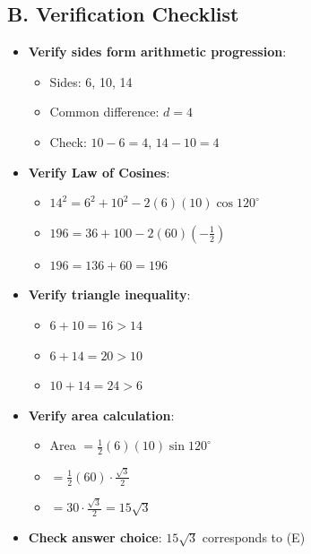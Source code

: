 \documentclass[12pt]{article}
\begin{document}
\begin{verificationbox}
\subsection*{B. Verification Checklist}
\begin{itemize}[leftmargin=*]
    \item \textbf{Verify sides form arithmetic progression}:
    \begin{itemize}
        \item Sides: 6, 10, 14
        \item Common difference: $d = 4$
        \item Check: $10 - 6 = 4$, $14 - 10 = 4$ \checkmark
    \end{itemize}
    \item \textbf{Verify Law of Cosines}:
    \begin{itemize}
        \item $14^2 = 6^2 + 10^2 - 2(6)(10)\cos 120^\circ$
        \item $196 = 36 + 100 - 2(60)(-\frac{1}{2})$
        \item $196 = 136 + 60 = 196$ \checkmark
    \end{itemize}
    \item \textbf{Verify triangle inequality}:
    \begin{itemize}
        \item $6 + 10 = 16 > 14$ \checkmark
        \item $6 + 14 = 20 > 10$ \checkmark
        \item $10 + 14 = 24 > 6$ \checkmark
    \end{itemize}
    \item \textbf{Verify area calculation}:
    \begin{itemize}
        \item Area $= \frac{1}{2}(6)(10)\sin 120^\circ$
        \item $= \frac{1}{2}(60) \cdot \frac{\sqrt{3}}{2}$
        \item $= 30 \cdot \frac{\sqrt{3}}{2} = 15\sqrt{3}$ \checkmark
    \end{itemize}
    \item \textbf{Check answer choice}: $15\sqrt{3}$ corresponds to (E) \checkmark
\end{itemize}


\end{verificationbox}
\end{document}
